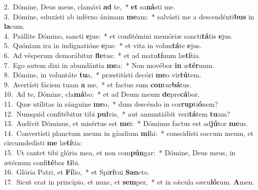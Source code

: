 {2.~}Dómine, Deus meus, clamávi \textbf{ad} te,~* \textbf{et} sa\textbf{ná}sti me.\\
{3.~}Dómine, eduxísti ab inférno ánimam \textbf{me}am:~* salvásti me a descendénti\textbf{bus} in \textbf{la}cum.\\
{4.~}Psállite Dómino, sancti \textbf{e}jus:~* et confitémini memóriæ sancti\textbf{tá}tis \textbf{e}jus.\\
{5.~}Quóniam ira in indignatióne \textbf{e}jus:~* et vita in volun\textbf{tá}te \textbf{e}jus.\\
{6.~}Ad vésperum demorábitur \textbf{fle}tus:~* et ad matu\textbf{tí}num læ\textbf{tí}tia.\\
{7.~}Ego autem dixi in abundántia \textbf{me}a:~* Non movébor \textbf{in} æ\textbf{tér}num.\\
{8.~}Dómine, in voluntáte \textbf{tu}a,~* præstitísti decóri \textbf{me}o vir\textbf{tú}tem.\\
{9.~}Avertísti fáciem tuam \textbf{a} me,~* et factus sum \textbf{con}tur\textbf{bá}tus.\\
{10.~}Ad te, Dómine, cla\textbf{má}bo:~* et ad Deum meum \textbf{de}pre\textbf{cá}bor.\\
{11.~}Quæ utílitas in sánguine \textbf{me}o,~* dum descéndo in cor\textbf{rup}ti\textbf{ó}nem?\\
{12.~}Numquid confitébitur tibi \textbf{pul}vis,~* aut annuntiábit veri\textbf{tá}tem \textbf{tu}am?\\
{13.~}Audívit Dóminus, et misértus est \textbf{me}i:~* Dóminus factus est ad\textbf{jú}tor \textbf{me}us.\\
{14.~}Convertísti planctum meum in gáudium \textbf{mi}hi:~* conscidísti saccum meum, et circumdedísti \textbf{me} læ\textbf{tí}tia:\\
{15.~}Ut cantet tibi glória mea, et non com\textbf{pún}gar:~* Dómine, Deus meus, in ætérnum confi\textbf{té}bor \textbf{ti}bi.\\
{16.~}Glória Patri, et \textbf{Fí}lio,~* et Spi\textbf{rí}tui \textbf{San}cto.\\
{17.~}Sicut erat in princípio, et nunc, et \textbf{sem}per,~* et in sǽcula sæcu\textbf{ló}rum. \textbf{A}men.\\
